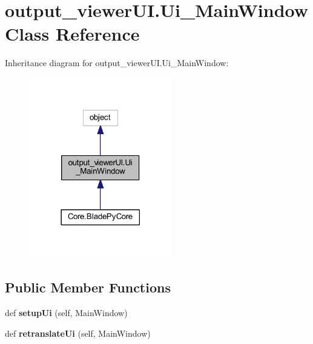 \hypertarget{a00099}{}\section{output\+\_\+viewer\+U\+I.\+Ui\+\_\+\+Main\+Window Class Reference}
\label{a00099}


Inheritance diagram for output\+\_\+viewer\+U\+I.\+Ui\+\_\+\+Main\+Window\+:
\nopagebreak
\begin{figure}[H]
\begin{center}
\leavevmode
\includegraphics[width=177pt]{a00098}
\end{center}
\end{figure}
\subsection*{Public Member Functions}
\begin{DoxyCompactItemize}
\item 
\hypertarget{a00099_a2a9ce5c092ffe5a4e4cabb341be7ceb4}{}\label{a00099_a2a9ce5c092ffe5a4e4cabb341be7ceb4} 
def {\bfseries setup\+Ui} (self, Main\+Window)
\item 
\hypertarget{a00099_a96efd9219a406e801e268b7add32cb78}{}\label{a00099_a96efd9219a406e801e268b7add32cb78} 
def {\bfseries retranslate\+Ui} (self, Main\+Window)
\end{DoxyCompactItemize}
